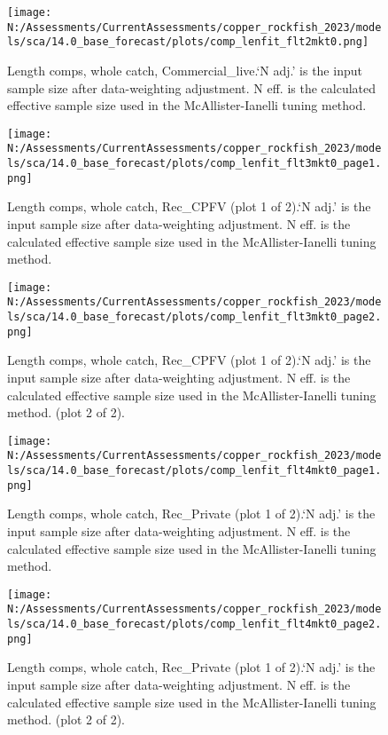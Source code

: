\documentclass[11pt,
  english,
  letterpaper,
]{article}
\begin{document}
\begin{figure}
\centering
\texttt{[image: N:/Assessments/CurrentAssessments/copper\_rockfish\_2023/models/sca/14.0\_base\_forecast/plots/comp\_lenfit\_flt2mkt0.png]}
\caption{Length comps, whole catch, Commercial\_live.`N adj.' is the input sample size after data-weighting adjustment. N eff. is the calculated effective sample size used in the McAllister-Ianelli tuning method.\label{fig:comp_lenfit_flt2mkt0}}
\end{figure}

\begin{figure}
\centering
\texttt{[image: N:/Assessments/CurrentAssessments/copper\_rockfish\_2023/models/sca/14.0\_base\_forecast/plots/comp\_lenfit\_flt3mkt0\_page1.png]}
\caption{Length comps, whole catch, Rec\_CPFV (plot 1 of 2).`N adj.' is the input sample size after data-weighting adjustment. N eff. is the calculated effective sample size used in the McAllister-Ianelli tuning method.\label{fig:comp_lenfit_flt3mkt0_page1}}
\end{figure}

\begin{figure}
\centering
\texttt{[image: N:/Assessments/CurrentAssessments/copper\_rockfish\_2023/models/sca/14.0\_base\_forecast/plots/comp\_lenfit\_flt3mkt0\_page2.png]}
\caption{Length comps, whole catch, Rec\_CPFV (plot 1 of 2).`N adj.' is the input sample size after data-weighting adjustment. N eff. is the calculated effective sample size used in the McAllister-Ianelli tuning method. (plot 2 of 2).\label{fig:comp_lenfit_flt3mkt0_page2}}
\end{figure}

\begin{figure}
\centering
\texttt{[image: N:/Assessments/CurrentAssessments/copper\_rockfish\_2023/models/sca/14.0\_base\_forecast/plots/comp\_lenfit\_flt4mkt0\_page1.png]}
\caption{Length comps, whole catch, Rec\_Private (plot 1 of 2).`N adj.' is the input sample size after data-weighting adjustment. N eff. is the calculated effective sample size used in the McAllister-Ianelli tuning method.\label{fig:comp_lenfit_flt4mkt0_page1}}
\end{figure}

\begin{figure}
\centering
\texttt{[image: N:/Assessments/CurrentAssessments/copper\_rockfish\_2023/models/sca/14.0\_base\_forecast/plots/comp\_lenfit\_flt4mkt0\_page2.png]}
\caption{Length comps, whole catch, Rec\_Private (plot 1 of 2).`N adj.' is the input sample size after data-weighting adjustment. N eff. is the calculated effective sample size used in the McAllister-Ianelli tuning method. (plot 2 of 2).\label{fig:comp_lenfit_flt4mkt0_page2}}
\end{figure}
\end{document}
